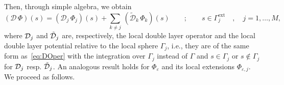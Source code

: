Then, through simple algebra, we obtain
\begin{equation}\label{eq:16}
(\mathcal{D} \, \Phi ) (s) = ( \mathcal{D}_j \, \Phi_j )(s) + \sum_{k \ne j} \,(\tilde{\mathcal{D}}_k \, \Phi_k )(s) \qquad ; \qquad s \in \Gamma_j^\text{ext} \quad, \quad  j = 1 , \ldots , M,
\end{equation}
where $\mathcal{D}_j$ and $\tilde{\mathcal{D}}_j$ are, respectively, the local double layer operator and the local double layer potential relative to the local sphere $\Gamma_j$, i.e., they are of the same form as~\eqref{eq:DOper} with the integration over $\Gamma_j$ instead of $\Gamma$ and $s\in\Gamma_j$ or $s\not\in\Gamma_j$ for $\mathcal{D}_j$ resp. $\tilde{\mathcal{D}}_j$. 
An analogous result holds for $\Phi_\varepsilon$ and its local extensions $\Phi_{\varepsilon,j}$.  %
We proceed as follows.

